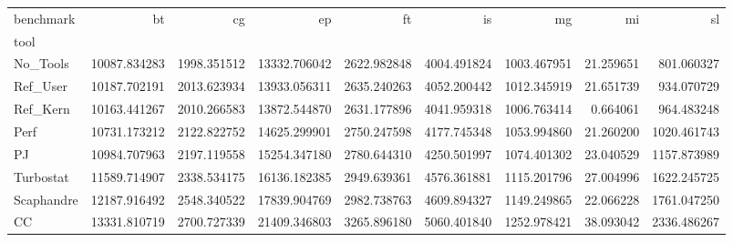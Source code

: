 \begin{tabular}{lrrrrrrrr}
\toprule
benchmark & bt & cg & ep & ft & is & mg & mi & sl \\
tool &  &  &  &  &  &  &  &  \\
\midrule
No_Tools & 10087.834283 & 1998.351512 & 13332.706042 & 2622.982848 & 4004.491824 & 1003.467951 & 21.259651 & 801.060327 \\
Ref_User & 10187.702191 & 2013.623934 & 13933.056311 & 2635.240263 & 4052.200442 & 1012.345919 & 21.651739 & 934.070729 \\
Ref_Kern & 10163.441267 & 2010.266583 & 13872.544870 & 2631.177896 & 4041.959318 & 1006.763414 & 0.664061 & 964.483248 \\
Perf & 10731.173212 & 2122.822752 & 14625.299901 & 2750.247598 & 4177.745348 & 1053.994860 & 21.260200 & 1020.461743 \\
PJ & 10984.707963 & 2197.119558 & 15254.347180 & 2780.644310 & 4250.501997 & 1074.401302 & 23.040529 & 1157.873989 \\
Turbostat & 11589.714907 & 2338.534175 & 16136.182385 & 2949.639361 & 4576.361881 & 1115.201796 & 27.004996 & 1622.245725 \\
Scaphandre & 12187.916492 & 2548.340522 & 17839.904769 & 2982.738763 & 4609.894327 & 1149.249865 & 22.066228 & 1761.047250 \\
CC & 13331.810719 & 2700.727339 & 21409.346803 & 3265.896180 & 5060.401840 & 1252.978421 & 38.093042 & 2336.486267 \\
\bottomrule
\end{tabular}
